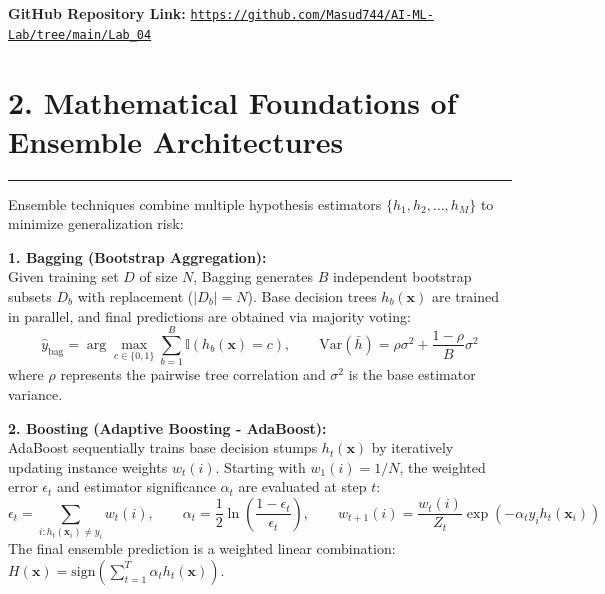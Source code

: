 \documentclass[11pt,a4paper]{article}
\begin{document}
\vspace{0.04cm}
\noindent\textbf{GitHub Repository Link: }
\href{https://github.com/Masud744/AI-ML-Lab/tree/main/Lab_04}{\texttt{https://github.com/Masud744/AI-ML-Lab/tree/main/Lab\_04}}\vspace{0.1cm}

\section*{2. Mathematical Foundations of Ensemble Architectures}
\noindent\rule{\textwidth}{0.5pt}\vspace{0.05cm}

Ensemble techniques combine multiple hypothesis estimators $\{h_1, h_2, \dots, h_M\}$ to minimize generalization risk:

\vspace{0.04cm}
\noindent\textbf{1. Bagging (Bootstrap Aggregation):}\\
Given training set $D$ of size $N$, Bagging generates $B$ independent bootstrap subsets $D_b$ with replacement ($|D_b| = N$). Base decision trees $h_b(\mathbf{x})$ are trained in parallel, and final predictions are obtained via majority voting:
{\setlength{\abovedisplayskip}{2pt}\setlength{\belowdisplayskip}{2pt}
\begin{equation}
    \hat{y}_{\text{bag}} = \arg\max_{c \in \{0, 1\}} \sum_{b=1}^{B} \mathbb{I}(h_b(\mathbf{x}) = c), \qquad \text{Var}\left(\bar{h}\right) = \rho \sigma^2 + \frac{1 - \rho}{B}\sigma^2
\end{equation}}
where $\rho$ represents the pairwise tree correlation and $\sigma^2$ is the base estimator variance.

\vspace{0.04cm}
\noindent\textbf{2. Boosting (Adaptive Boosting - AdaBoost):}\\
AdaBoost sequentially trains base decision stumps $h_t(\mathbf{x})$ by iteratively updating instance weights $w_t(i)$. Starting with $w_1(i) = 1/N$, the weighted error $\epsilon_t$ and estimator significance $\alpha_t$ are evaluated at step $t$:
{\setlength{\abovedisplayskip}{2pt}\setlength{\belowdisplayskip}{2pt}
\begin{equation}
    \epsilon_t = \sum_{i: h_t(\mathbf{x}_i) \neq y_i} w_t(i), \qquad \alpha_t = \frac{1}{2}\ln\left(\frac{1 - \epsilon_t}{\epsilon_t}\right), \qquad w_{t+1}(i) = \frac{w_t(i)}{Z_t} \exp\left(-\alpha_t y_i h_t(\mathbf{x}_i)\right)
\end{equation}}
The final ensemble prediction is a weighted linear combination: $H(\mathbf{x}) = \text{sign}\left(\sum_{t=1}^{T} \alpha_t h_t(\mathbf{x})\right)$.
\end{document}
